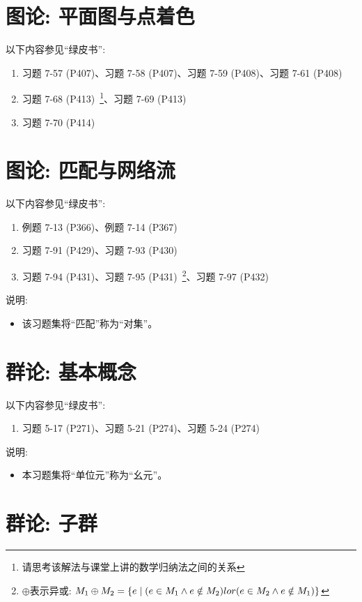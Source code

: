 \documentclass{article}
\begin{document}
\section{图论: 平面图与点着色}

以下内容参见``绿皮书'':
\begin{enumerate}[(1)]
  \item 习题 7-57 (P407)、习题 7-58 (P407)、习题 7-59 (P408)、习题 7-61 (P408)
  \item 习题 7-68 (P413)~\footnote{请思考该解法与课堂上讲的数学归纳法之间的关系}、习题 7-69 (P413)
  \item 习题 7-70 (P414)
\end{enumerate}
\section{图论: 匹配与网络流}

以下内容参见``绿皮书'':
\begin{enumerate}[(1)]
  \item 例题 7-13 (P366)、例题 7-14 (P367)
  \item 习题 7-91 (P429)、习题 7-93 (P430)
  \item 习题 7-94 (P431)、习题 7-95 (P431)~\footnote{$\oplus$表示异或:
    $M_{1} \oplus M_{2} = \{e \mid (e \in M_{1} \land e \notin M_{2})
      \\lor (e \in M_{2} \land e \notin M_{1})\}$}、习题 7-97 (P432)
\end{enumerate}

说明:
\begin{itemize}
  \item 该习题集将``匹配''称为``对集''。
\end{itemize}
\section{群论: 基本概念}

以下内容参见``绿皮书'':
\begin{enumerate}[(1)]
  \item 习题 5-17 (P271)、习题 5-21 (P274)、习题 5-24 (P274)
\end{enumerate}

说明:
\begin{itemize}
  \item 本习题集将``单位元''称为``幺元''。
\end{itemize}
\section{群论: 子群}
\end{document}
